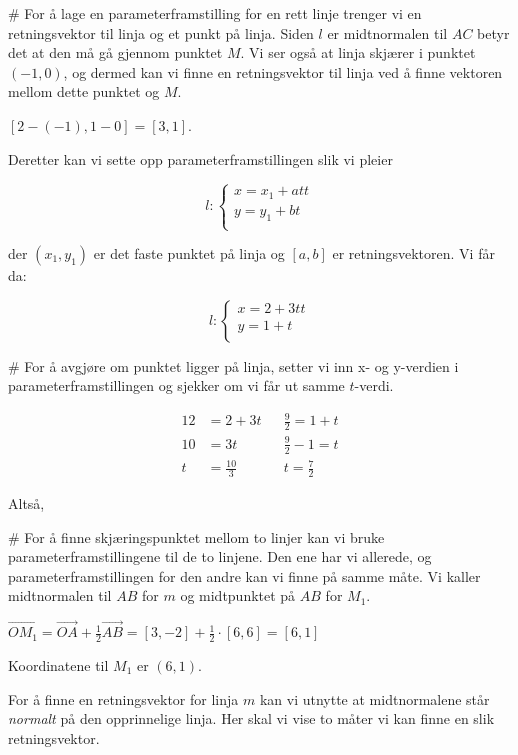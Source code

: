 \begin{easylist}[enumerate]
\begin{easylist}[enumerate]
\begin{easylist}[enumerate]
	
	# For å lage en parameterframstilling for en rett linje trenger vi en retningsvektor til linja og et punkt på linja. Siden $l$ er midtnormalen til $AC$ betyr det at den må gå gjennom punktet $M$. Vi ser også at linja skjærer i punktet $(-1,0)$, og dermed kan vi finne en retningsvektor til linja ved å finne vektoren mellom dette punktet og $M$. 
	
	$[2-(-1),1-0] = [3,1]$.
	
	Deretter kan vi sette opp parameterframstillingen slik vi pleier
	
	\[
		l : \begin{cases}
				x = x_1 + at t\\
				y = y_1 + bt \\
		\end{cases}
	\]
	
	der $(x_1,y_1)$ er det faste punktet på linja og $[a,b]$ er retningsvektoren. Vi får da:
	
	
		\[
		l : \begin{cases}
		x = 2 + 3t t\\
		y = 1 + t \\
		\end{cases}
		\]
		
	# For å avgjøre om punktet ligger på linja, setter vi inn x- og y-verdien i parameterframstillingen og sjekker om vi får ut samme $t$-verdi.
	
	\begin{align*}
		12 & = 2 + 3t  && \frac{9}{2}  = 1 + t\\
		10 & = 3t  && \frac{9}{2} - 1  = t\\
		t & = \frac{10}{3} && t  = \frac{7}{2}
	\end{align*}
	
	Altså, 
	
	# For å finne skjæringspunktet mellom to linjer kan vi bruke parameterframstillingene til de to linjene. Den ene har vi allerede, og parameterframstillingen for den andre kan vi finne på samme måte. Vi kaller midtnormalen til $AB$ for $m$ og midtpunktet på $AB$ for $M_1$. 

	$\vec{OM_1} = \vec{OA} + \frac{1}{2} \vec{AB} = [3,-2] + \frac{1}{2} \cdot [6,6] = [6,1]$
	
	Koordinatene til $M_1$ er $(6,1)$.  
	
	For å finne en retningsvektor for linja $m$ kan vi utnytte at midtnormalene står \textit{normalt} på den opprinnelige linja. Her skal vi vise to måter vi kan finne en slik retningsvektor.
	

\end{easylist}
\end{easylist}
\end{easylist}
